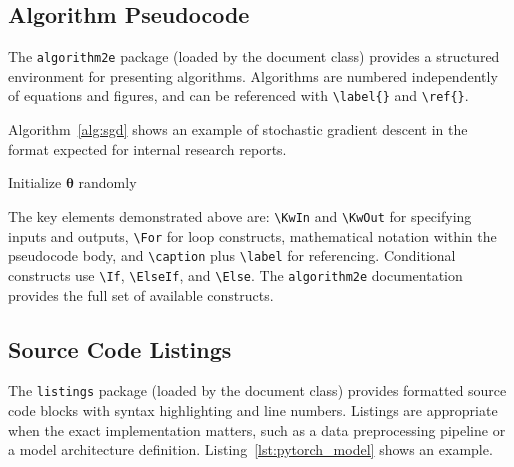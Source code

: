 \documentclass{iteso-irr}
\begin{document}
\subsection{Algorithm Pseudocode}
\label{sec:pseudocode}

The \texttt{algorithm2e} package (loaded by the document class) provides
a structured environment for presenting algorithms. Algorithms are
numbered independently of equations and figures, and can be referenced
with \verb|\label{}| and \verb|\ref{}|.

Algorithm~\ref{alg:sgd} shows an example of stochastic gradient descent
in the format expected for internal research reports.

\begin{algorithm}[htbp]
\SetAlgoLined
{}
Initialize $\bm{\theta}$ randomly\;
\Return{$\bm{\theta}$}\;
\caption{Mini-Batch Stochastic Gradient Descent}
\label{alg:sgd}
\end{algorithm}

The key elements demonstrated above are: \verb|\KwIn| and \verb|\KwOut|
for specifying inputs and outputs, \verb|\For| for loop constructs,
mathematical notation within the pseudocode body, and
\verb|\caption| plus \verb|\label| for referencing. Conditional
constructs use \verb|\If|, \verb|\ElseIf|, and \verb|\Else|. The
\texttt{algorithm2e} documentation provides the full set of available
constructs.

\subsection{Source Code Listings}
\label{sec:code_listings}

The \texttt{listings} package (loaded by the document class) provides
formatted source code blocks with syntax highlighting and line numbers.
Listings are appropriate when the exact implementation matters, such as
a data preprocessing pipeline or a model architecture definition.
Listing~\ref{lst:pytorch_model} shows an example.
\end{document}
